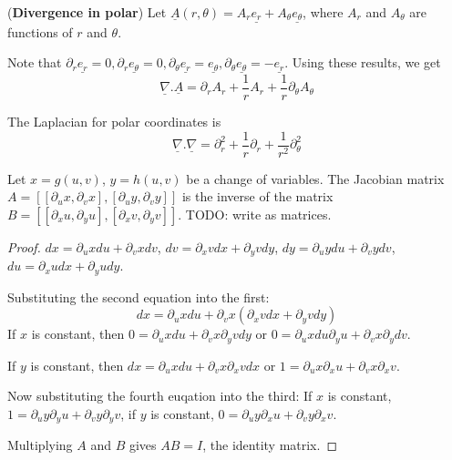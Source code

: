 \begin{definition}
	(\textbf{Divergence in polar}) Let $\underline{A}(r, \theta) = A_r \underline{e_r} + A_{\theta} \underline{e_{\theta}}$, where $A_r$ and $A_{\theta}$ are functions of $r$ and $\theta$.

	Note that $\partial_r \underline{e_r} = 0, \partial_r \underline{e_{\theta}} = 0, \partial_{\theta} \underline{e_r} = \underline{e_{\theta}}, \partial_{\theta} \underline{e_{\theta}} = -\underline{e_r}$. Using these results, we get
	\[
		\underline{\nabla} . \underline{A} = \partial_r A_r + \frac{1}{r} A_r + \frac{1}{r} \partial_{\theta} A_{\theta}
	\]
\end{definition}

\begin{definition}
	The Laplacian for polar coordinates is
	\[
		\underline{\nabla} . \underline{\nabla} = \partial_r^2 + \frac{1}{r} \partial_r + \frac{1}{r^2} \partial_{\theta}^2
	\]
\end{definition}

\begin{proposition}
	Let $x = g(u, v)$, $y = h(u, v)$ be a change of variables. The Jacobian matrix $A = [[\partial_u x, \partial_v x], [\partial_u y, \partial_v y]]$ is the inverse of the matrix $B = [[\partial_x u, \partial_y u], [\partial_x v, \partial_y v]]$. TODO: write as matrices.
\end{proposition}

\begin{proof}
	$dx = \partial_u x du + \partial_v x dv$, $dv = \partial_x v dx + \partial_y v dy$, $dy = \partial_u y du + \partial_v y dv$, $du = \partial_x u dx + \partial_y u dy$.

	Substituting the second equation into the first:
	\[
		dx = \partial_u x du + \partial_v x (\partial_x v dx + \partial_y v dy)
	\]
	If $x$ is constant, then $0 = \partial_u x du + \partial_v x \partial_y v dy$ or $0 = \partial_u x du \partial_y u + \partial_v x \partial_y dv$.

	If $y$ is constant, then $dx = \partial_u x du + \partial_v x \partial_x v dx$ or $1 = \partial_u x \partial_x u + \partial_v x \partial_x v$.

	Now substituting the fourth euqation into the third:
	If $x$ is constant, $1 = \partial_u y \partial_y u + \partial_v y \partial_y v$, if $y$ is constant, $0 = \partial_u y \partial_x u + \partial_v y \partial_x v$.

	Multiplying $A$ and $B$ gives $AB = I$, the identity matrix.
\end{proof}

